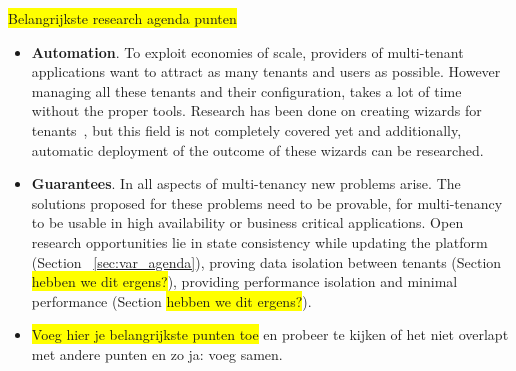 \documentclass{article}
\newcommand{\highlight}[1]{\colorbox{yellow}{#1}}
\begin{document}
\highlight{Belangrijkste research agenda punten}
\begin{itemize}

\item \textbf{Automation}. 
To exploit economies of scale, providers of multi-tenant applications want to attract as many tenants and users as possible. 
However managing all these tenants and their configuration, takes a lot of time without the proper tools. 
Research has been done on creating wizards for tenants~\cite{mietzner2008generation,mietzner2008defining}, but this field is not completely covered yet and additionally, automatic deployment of the outcome of these wizards can be researched. 
\item \textbf{Guarantees}. 
In all aspects of multi-tenancy new problems arise. 
The solutions proposed for these problems need to be provable, for multi-tenancy to be usable in high availability or business critical applications. 
Open research opportunities lie in state consistency while updating the platform (Section ~\ref{sec:var_agenda}), proving data isolation between tenants (Section \highlight{hebben we dit ergens?}), providing performance isolation and minimal performance (Section \highlight{hebben we dit ergens?}).

\item \highlight{Voeg hier je belangrijkste punten toe}  en probeer te kijken of het niet overlapt met andere punten en zo ja: voeg samen.
\end{itemize}



\end{document}
